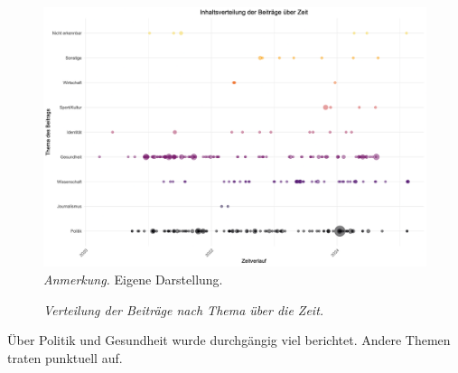 \documentclass[12pt,a4paper]{article}        %
\begin{document}
\begin{figure}[H]
  \caption{\textit{Verteilung der Beiträge nach Thema über die Zeit.}}
  \label{fig:results_date_dependency}
  \centering
  \includegraphics[width=1\linewidth]{images/date_dependency_plot.png}
\footnotesize\textit{Anmerkung.} Eigene Darstellung.
\end{figure}
Über Politik und Gesundheit wurde durchgängig viel berichtet. Andere Themen traten punktuell auf.
\end{document}
